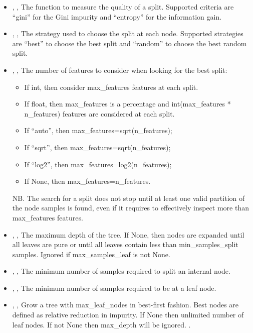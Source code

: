 \begin{itemize}
  \item {} , ,
  The function to measure the quality of a split.
  Supported criteria are ``gini'' for the Gini impurity and ``entropy'' for the
  information gain.
  \item {} , ,
  The strategy used to choose the split at each node.
  Supported strategies are ``best'' to choose the best split and ``random'' to
  choose the best random split.
  \item {} , ,
  The number of features to consider when looking for the best split:
\begin{itemize}
    \item If int, then consider max\_features features at each split.
    \item If float, then max\_features is a percentage and int(max\_features *
    n\_features) features are considered at each split.
    \item If “auto”, then max\_features=sqrt(n\_features);
    \item If “sqrt”, then max\_features=sqrt(n\_features);
    \item If “log2”, then max\_features=log2(n\_features);
    \item If None, then max\_features=n\_features.
\end{itemize}
  NB.
  The search for a split does not stop until at least one valid partition of the
  node samples is found, even if it requires to effectively inspect more than
  max\_features features.
  \\
  \item {} , ,
  The maximum depth of the tree.
  If None, then nodes are expanded until all leaves are pure or until all leaves
  contain less than min\_samples\_split samples.
  Ignored if max\_samples\_leaf is not None.
  \item {} , ,
  The minimum number of samples required to split an internal node.
  \item {} , ,
  The minimum number of samples required to be at a leaf node.
  \item {} , ,
  Grow a tree with max\_leaf\_nodes in best-first fashion.
  Best nodes are defined as relative reduction in impurity.
  If None then unlimited number of leaf nodes.
  If not None then max\_depth will be ignored.
  .
\end{itemize}
